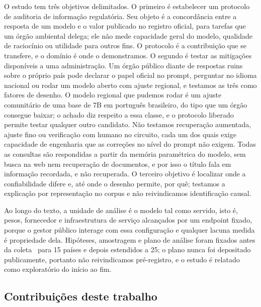 O estudo tem três objetivos delimitados. O primeiro é estabelecer um protocolo
de auditoria de informação regulatória. Seu objeto é a concordância entre a
resposta de um modelo e o valor publicado no registro oficial, para tarefas que
um órgão ambiental delega; ele não mede capacidade geral do modelo, qualidade de
raciocínio ou utilidade para outros fins. O protocolo é a contribuição que se
transfere, e o domínio é onde o demonstramos. O segundo é testar as mitigações
disponíveis a uma administração. Um órgão público diante de respostas ruins
sobre o próprio país pode declarar o papel oficial no prompt, perguntar no
idioma nacional ou rodar um modelo aberto com ajuste regional, e testamos as
três como fatores de desenho. O modelo regional que pudemos rodar é um ajuste
comunitário de uma base de 7B em português brasileiro, do tipo que um órgão
consegue baixar; o achado diz respeito a essa classe, e o protocolo liberado
permite testar qualquer outro candidato. Não testamos recuperação aumentada,
ajuste fino ou verificação com humano no circuito, cada um dos quais exige
capacidade de engenharia que as correções no nível do prompt não exigem. Todas as consultas
são respondidas a partir da memória paramétrica do modelo, sem busca na web nem
recuperação de documentos, e por isso o título fala em informação recordada, e
não recuperada. O terceiro objetivo é localizar onde a confiabilidade difere e,
até onde o desenho permite, por quê; testamos a explicação por representação no
corpus e não reivindicamos identificação causal.

Ao longo do texto, a unidade de análise é o modelo tal como servido, isto é,
pesos, fornecedor e infraestrutura de serviço alcançados por um endpoint fixado,
porque o gestor público interage com essa configuração e qualquer lacuna medida é
propriedade dela. Hipóteses, amostragem e plano de análise foram fixados antes
da coleta~\citep{nosek2018preregistration} para 15 países e depois estendidos a
25; o plano nunca foi depositado publicamente, portanto não reivindicamos
pré-registro, e o estudo é relatado como exploratório do início ao fim.

\subsection*{Contribuições deste trabalho}

